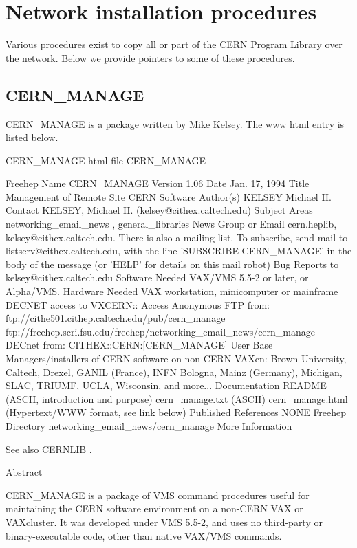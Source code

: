 \chapter{Network installation procedures}

Various procedures exist to copy all or part of the CERN Program
Library over the network. Below we provide pointers to some
of these procedures.

\section{CERN\_MANAGE}

CERN\_MANAGE is a package written by Mike Kelsey. The www html entry is
listed below.


\begin{XMPt}{CERN\_MANAGE html file}
CERN_MANAGE

Freehep Name
   CERN_MANAGE 
Version
   1.06 
Date
   Jan.  17, 1994 
Title
   Management of Remote Site CERN Software 
Author(s)
   KELSEY Michael H.  
Contact
   KELSEY, Michael H.  (kelsey@cithex.caltech.edu) 
Subject Areas
   networking_email_news , general_libraries 
News Group or Email
   cern.heplib, kelsey@cithex.caltech.edu.  There is also a
   mailing list.  To subscribe, send mail to
   listserv@cithex.caltech.edu, with the line 'SUBSCRIBE
   CERN_MANAGE' in the body of the message (or 'HELP' for details
   on this mail robot) 
Bug Reports to
   kelsey@cithex.caltech.edu 
Software Needed
   VAX/VMS 5.5-2 or later, or Alpha/VMS.  
Hardware Needed
   VAX workstation, minicomputer or mainframe DECNET access to
   VXCERN:: 
Access
   Anonymous FTP from: 
   ftp://cithe501.cithep.caltech.edu/pub/cern_manage 
   ftp://freehep.scri.fsu.edu/freehep/networking_email_news/cern_manage
   DECnet from: CITHEX::CERN:[CERN_MANAGE] 
User Base
   Managers/installers of CERN software on non-CERN VAXen: Brown
   University, Caltech, Drexel, GANIL (France), INFN Bologna,
   Mainz (Germany), Michigan, SLAC, TRIUMF, UCLA, Wisconsin, and
   more...  
Documentation
   README (ASCII, introduction and purpose) cern_manage.txt
   (ASCII) cern_manage.html (Hypertext/WWW format, see link below) 
Published References
   NONE 
Freehep Directory
   networking_email_news/cern_manage 
More Information

See also CERNLIB .  

Abstract

CERN_MANAGE is a package of VMS command procedures useful for
maintaining the CERN software environment on a non-CERN VAX or
VAXcluster.  It was developed under VMS 5.5-2, and uses no
third-party or binary-executable code, other than native VAX/VMS
commands.  


\end{XMPt}
